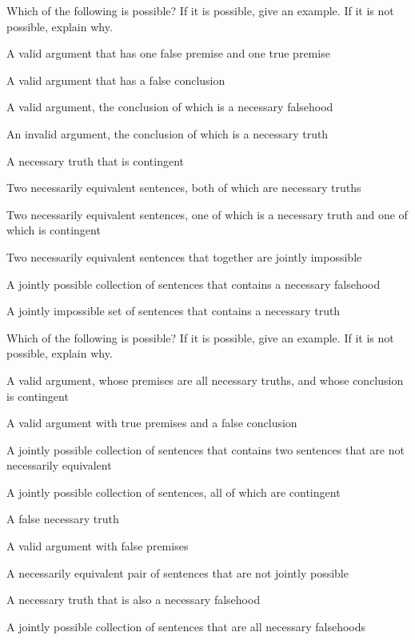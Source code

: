\problempart
\label{pr.EnglishCombinations2}
Which of the following is possible? If it is possible, give an example. If it is not possible, explain why.
\begin{earg}
\item A valid argument that has one false premise and one true premise

\item A valid argument that has a false conclusion

\item A valid argument, the conclusion of which is a necessary falsehood

\item An invalid argument, the conclusion of which is a necessary truth

\item A necessary truth that is contingent

\item Two necessarily equivalent sentences, both of which are necessary truths

\item Two necessarily equivalent sentences, one of which is a necessary truth and one of which is contingent

\item Two necessarily equivalent sentences that together are jointly impossible

\item A jointly possible collection of sentences that contains a necessary falsehood

\item A jointly impossible set of sentences that contains a necessary truth
\end{earg}

\problempart
Which of the following is possible? If it is possible, give an example. If it is not possible, explain why.

\begin{earg}
\item A valid argument, whose premises are all necessary truths, and whose conclusion is contingent
\item A valid argument with true premises and a false conclusion
\item A jointly possible collection of sentences that contains two sentences that are not necessarily equivalent
\item A jointly possible collection of sentences, all of which are contingent
\item A false necessary truth
\item A valid argument with false premises
\item A necessarily equivalent pair of sentences that are not jointly possible
\item A necessary truth that is also a necessary falsehood
\item A jointly possible collection of sentences that are all necessary falsehoods
\end{earg}

